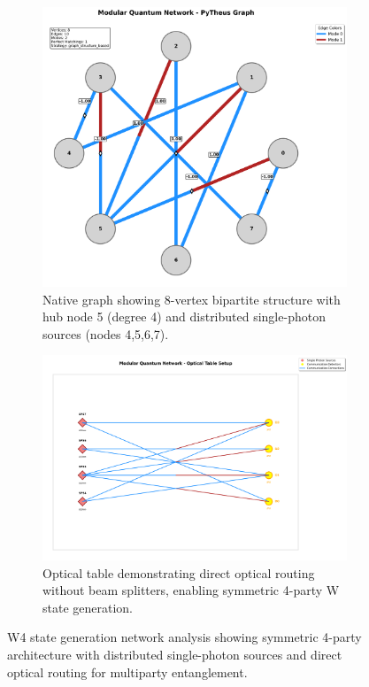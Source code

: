 \documentclass[11pt,a4paper]{article}
\begin{document}
\begin{figure}[htbp]
\centering
\begin{subfigure}{0.45\textwidth}
\includegraphics[width=\textwidth]{journal_w4_state_native_plot.png}
\caption{Native graph showing 8-vertex bipartite structure with hub node 5 (degree 4) and distributed single-photon sources (nodes 4,5,6,7).}
\end{subfigure}
\hfill
\begin{subfigure}{0.45\textwidth}
\includegraphics[width=\textwidth]{journal_w4_state_optical_table_setup.png}
\caption{Optical table demonstrating direct optical routing without beam splitters, enabling symmetric 4-party W state generation.}
\end{subfigure}
\caption{W4 state generation network analysis showing symmetric 4-party architecture with distributed single-photon sources and direct optical routing for multiparty entanglement.}
\label{fig:w4_analysis}
\end{figure}
\end{document}
